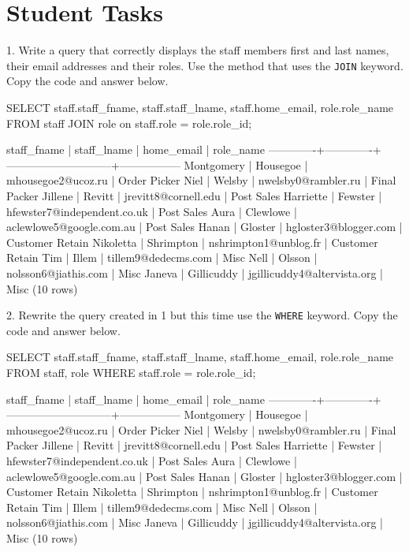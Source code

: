 \section*{Student Tasks}
1. Write a query that correctly displays the staff members first and last names, their email addresses and their roles. Use the method that uses the \texttt{JOIN} keyword. Copy the code and answer below.
\begin{sql}
SELECT staff.staff_fname, staff.staff_lname, staff.home_email, role.role_name FROM staff
JOIN role on staff.role = role.role_id;
\end{sql}
\begin{pseudo*}
 staff_fname | staff_lname |         home_email          |    role_name    
-------------+-------------+-----------------------------+-----------------
 Montgomery  | Housegoe    | mhousegoe2@ucoz.ru          | Order Picker
 Niel        | Welsby      | nwelsby0@rambler.ru         | Final Packer
 Jillene     | Revitt      | jrevitt8@cornell.edu        | Post Sales
 Harriette   | Fewster     | hfewster7@independent.co.uk | Post Sales
 Aura        | Clewlowe    | aclewlowe5@google.com.au    | Post Sales
 Hanan       | Gloster     | hgloster3@blogger.com       | Customer Retain
 Nikoletta   | Shrimpton   | nshrimpton1@unblog.fr       | Customer Retain
 Tim         | Illem       | tillem9@dedecms.com         | Misc
 Nell        | Olsson      | nolsson6@jiathis.com        | Misc
 Janeva      | Gillicuddy  | jgillicuddy4@altervista.org | Misc
(10 rows)
\end{pseudo*}
2. Rewrite the query created in 1 but this time use the \texttt{WHERE} keyword. Copy the code and answer below.
\begin{sql}
SELECT staff.staff_fname, staff.staff_lname, staff.home_email, role.role_name FROM staff, role
WHERE staff.role = role.role_id;
\end{sql}
\begin{pseudo*}
 staff_fname | staff_lname |         home_email          |    role_name
-------------+-------------+-----------------------------+-----------------
 Montgomery  | Housegoe    | mhousegoe2@ucoz.ru          | Order Picker
 Niel        | Welsby      | nwelsby0@rambler.ru         | Final Packer
 Jillene     | Revitt      | jrevitt8@cornell.edu        | Post Sales
 Harriette   | Fewster     | hfewster7@independent.co.uk | Post Sales
 Aura        | Clewlowe    | aclewlowe5@google.com.au    | Post Sales
 Hanan       | Gloster     | hgloster3@blogger.com       | Customer Retain
 Nikoletta   | Shrimpton   | nshrimpton1@unblog.fr       | Customer Retain
 Tim         | Illem       | tillem9@dedecms.com         | Misc
 Nell        | Olsson      | nolsson6@jiathis.com        | Misc
 Janeva      | Gillicuddy  | jgillicuddy4@altervista.org | Misc
(10 rows)
\end{pseudo*}

